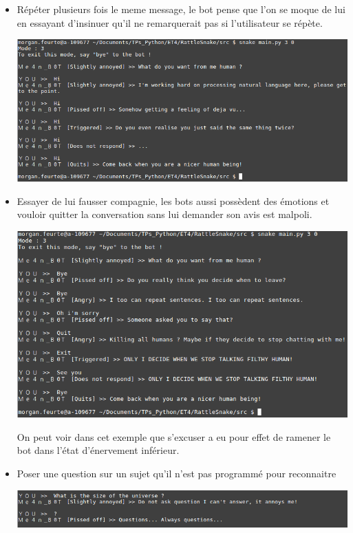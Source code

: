 \documentclass[paper=a4, fontsize=11pt]{article}
\begin{document}
\begin{itemize}
\item Répéter plusieurs fois le meme message, le bot pense que l'on se moque de lui en essayant d'insinuer qu'il ne remarquerait pas si l'utilisateur se répète.

\begin{center}
\includegraphics[width=500pt]{MeanBot_repetition.png}
\end{center}


\item Essayer de lui fausser compagnie, les bots aussi possèdent des émotions et vouloir quitter la conversation sans lui demander son avis est malpoli.

\begin{center}
\includegraphics[width=500pt]{MeanBot_exit_sorry.png}
\end{center} On peut voir dans cet exemple que s'excuser a eu pour effet de ramener le bot dans l'état d'énervement inférieur.


\item Poser une question sur un sujet qu'il n'est pas programmé pour reconnaitre

\begin{center}
\includegraphics[width=500pt]{MeanBot_questions.png}
\end{center}



\end{itemize}
\end{document}
